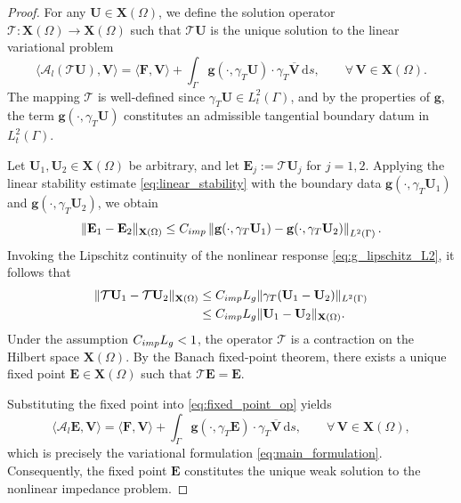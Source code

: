 \documentclass[10pt,a4paper]{amsart}
\numberwithin{equation}{section}
\begin{document}
\begin{proof}
For any $\mathbf{U} \in \mathbf{X}(\Omega)$, we define the solution operator $\mathcal{T} \colon \mathbf{X}(\Omega) \to \mathbf{X}(\Omega)$ such that $\mathcal{T}\mathbf{U}$ is the unique solution to the linear variational problem
\begin{equation}\label{eq:fixed_point_op}
\langle \mathscr {A}_l (\mathcal{T}\mathbf{U}), \mathbf{V} \rangle = \langle \mathbf{F}, \mathbf{V} \rangle + \int_\Gamma \mathbf{g}(\cdot, \gamma_T \mathbf{U}) \cdot \gamma_T \overline{\mathbf{V}} \, \mathrm{d}s, \qquad \forall \, \mathbf{V} \in \mathbf{X}(\Omega).
\end{equation}
The mapping $\mathcal{T}$ is well-defined since $\gamma_T \mathbf{U} \in L_t^2(\Gamma)$, and by the properties of $\mathbf{g}$, the term $\mathbf{g}(\cdot, \gamma_T \mathbf{U})$ constitutes an admissible tangential boundary datum in $L_t^2(\Gamma)$.

Let $\mathbf{U}_1, \mathbf{U}_2 \in \mathbf{X}(\Omega)$ be arbitrary, and let $\mathbf{E}_j := \mathcal{T}\mathbf{U}_j$ for $j=1,2$. Applying the linear stability estimate \eqref{eq:linear_stability} with the boundary data $\mathbf{g}(\cdot, \gamma_T \mathbf{U}_1)$ and $\mathbf{g}(\cdot, \gamma_T \mathbf{U}_2)$, we obtain
\[
\|\mathbf{E}_1 - \mathbf{E}_2\|_{\mathbf{X}(\Omega)} \le C_{\rm imp} \left\| \mathbf{g}(\cdot, \gamma_T \mathbf{U}_1) - \mathbf{g}(\cdot, \gamma_T \mathbf{U}_2) \right\|_{L^2(\Gamma)}.
\]
Invoking the Lipschitz continuity of the nonlinear response \eqref{eq:g_lipschitz_L2}, it follows that
\[
\begin{aligned}
\|\mathcal{T}\mathbf{U}_1 - \mathcal{T}\mathbf{U}_2\|_{\mathbf{X}(\Omega)} &\le C_{\rm imp} L_g \|\gamma_T(\mathbf{U}_1 - \mathbf{U}_2)\|_{L^2(\Gamma)} \\
&\le C_{\rm imp} L_g \|\mathbf{U}_1 - \mathbf{U}_2\|_{\mathbf{X}(\Omega)}.
\end{aligned}
\]
Under the assumption $C_{\rm imp} L_g < 1$, the operator $\mathcal{T}$ is a contraction on the Hilbert space $\mathbf{X}(\Omega)$. By the Banach fixed-point theorem, there exists a unique fixed point $\mathbf{E} \in \mathbf{X}(\Omega)$ such that $\mathcal{T}\mathbf{E} = \mathbf{E}$.

Substituting the fixed point into \eqref{eq:fixed_point_op} yields
\[
\langle \mathscr {A}_l \mathbf{E}, \mathbf{V} \rangle = \langle \mathbf{F}, \mathbf{V} \rangle + \int_\Gamma \mathbf{g}(\cdot, \gamma_T \mathbf{E}) \cdot \gamma_T \overline{\mathbf{V}} \, \mathrm{d}s, \qquad \forall \, \mathbf{V} \in \mathbf{X}(\Omega),
\]
which is precisely the variational formulation \eqref{eq:main_formulation}. Consequently, the fixed point $\mathbf{E}$ constitutes the unique weak solution to the nonlinear impedance problem.
\end{proof}
\end{document}
